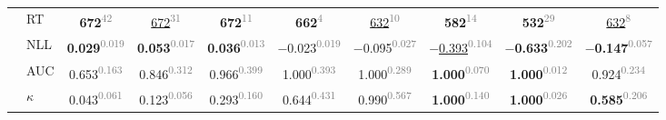 \begin{table}[t]
{\begin{tabular}{@{} ll ccccccc c @{}}
     & RT & \textbf{672}\textsuperscript{\textcolor{gray}{\tiny 42}} & \underline{672}\textsuperscript{\textcolor{gray}{\tiny 31}} & \textbf{672}\textsuperscript{\textcolor{gray}{\tiny 11}} & \textbf{662}\textsuperscript{\textcolor{gray}{\tiny 4}} & \underline{632}\textsuperscript{\textcolor{gray}{\tiny 10}} & \textbf{582}\textsuperscript{\textcolor{gray}{\tiny 14}} & \textbf{532}\textsuperscript{\textcolor{gray}{\tiny 29}} & \underline{632}\textsuperscript{\textcolor{gray}{\tiny 8}} \\
     & NLL & \textbf{0.029}\textsuperscript{\textcolor{gray}{\tiny 0.019}} & \textbf{0.053}\textsuperscript{\textcolor{gray}{\tiny 0.017}} & \textbf{0.036}\textsuperscript{\textcolor{gray}{\tiny 0.013}} & $-$0.023\textsuperscript{\textcolor{gray}{\tiny 0.019}} & $-$0.095\textsuperscript{\textcolor{gray}{\tiny 0.027}} & \underline{$-$0.393}\textsuperscript{\textcolor{gray}{\tiny 0.104}} & \textbf{$-$0.633}\textsuperscript{\textcolor{gray}{\tiny 0.202}} & \textbf{$-$0.147}\textsuperscript{\textcolor{gray}{\tiny 0.057}} \\
     & AUC & 0.653\textsuperscript{\textcolor{gray}{\tiny 0.163}} & 0.846\textsuperscript{\textcolor{gray}{\tiny 0.312}} & 0.966\textsuperscript{\textcolor{gray}{\tiny 0.399}} & 1.000\textsuperscript{\textcolor{gray}{\tiny 0.393}} & 1.000\textsuperscript{\textcolor{gray}{\tiny 0.289}} & \textbf{1.000}\textsuperscript{\textcolor{gray}{\tiny 0.070}} & \textbf{1.000}\textsuperscript{\textcolor{gray}{\tiny 0.012}} & 0.924\textsuperscript{\textcolor{gray}{\tiny 0.234}} \\
     & $\kappa$ & 0.043\textsuperscript{\textcolor{gray}{\tiny 0.061}} & 0.123\textsuperscript{\textcolor{gray}{\tiny 0.056}} & 0.293\textsuperscript{\textcolor{gray}{\tiny 0.160}} & 0.644\textsuperscript{\textcolor{gray}{\tiny 0.431}} & 0.990\textsuperscript{\textcolor{gray}{\tiny 0.567}} & \textbf{1.000}\textsuperscript{\textcolor{gray}{\tiny 0.140}} & \textbf{1.000}\textsuperscript{\textcolor{gray}{\tiny 0.026}} & \textbf{0.585}\textsuperscript{\textcolor{gray}{\tiny 0.206}} \\
    \bottomrule
  \end{tabular}}
\end{table}